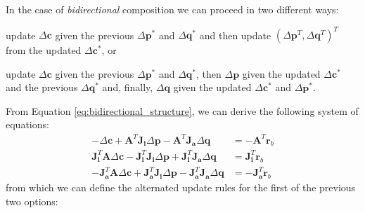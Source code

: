 In the case of \emph{bidirectional} composition we can proceed in two different ways:
\begin{inparaenum}
\item update $\Delta\mathbf{c}$ given the previous $\Delta\mathbf{p}^*$ and $\Delta\mathbf{q}^*$ and then update $(\Delta\mathbf{p}^T, \Delta\mathbf{q}^T)^T$ from the updated $\Delta\mathbf{c}^*$, or
\item update $\Delta\mathbf{c}$ given the previous $\Delta\mathbf{p}^*$ and $\Delta\mathbf{q}^*$, then  $\Delta\mathbf{p}$ given the updated $\Delta\mathbf{c}^*$ and the previous $\Delta\mathbf{q}^*$ and, finally, $\Delta\mathbf{q}$ given the updated $\Delta\mathbf{c}^*$ and $\Delta\mathbf{p}^*$.
\end{inparaenum}

From Equation \ref{eq:bidirectional_structure}, we can derive the following system of equations:
\begin{equation}
    \begin{aligned}
        -\Delta\mathbf{c} + \mathbf{A}^T \mathbf{J}_\mathbf{i} \Delta\mathbf{p} - \mathbf{A}^T \mathbf{J}_\mathbf{a} \Delta\mathbf{q} & = -\mathbf{A}^T \mathbf{r}_b
        \\
        \mathbf{J}_{\mathbf{i}}^T \mathbf{A} \Delta\mathbf{c} - \mathbf{J}_{\mathbf{i}}^T \mathbf{J}_\mathbf{i} \Delta\mathbf{p} + \mathbf{J}_{\mathbf{i}}^T \mathbf{J}_\mathbf{a} \Delta\mathbf{q} & = \mathbf{J}_{\mathbf{i}}^T \mathbf{r}_b
        \\
        -\mathbf{J}_{\mathbf{a}}^T \mathbf{A} \Delta\mathbf{c} + \mathbf{J}_{\mathbf{a}}^T \mathbf{J}_\mathbf{i} \Delta\mathbf{p} - \mathbf{J}_{\mathbf{a}}^T \mathbf{J}_\mathbf{a} \Delta\mathbf{q} & = -\mathbf{J}_{\mathbf{a}}^T \mathbf{r}_b
    \label{eq:bidirectional_alt_system}
    \end{aligned}
\end{equation}
from which we can define the alternated update rules for the first of the previous two options:
